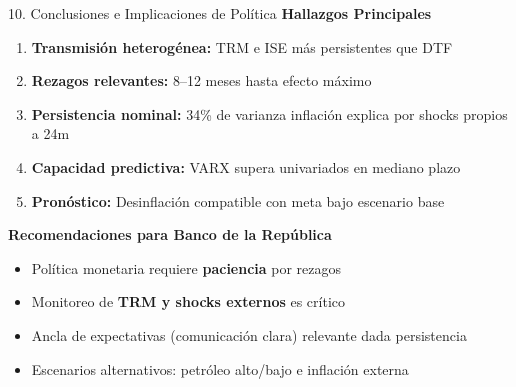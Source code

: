 \documentclass[spanish, 11pt]{beamer}
\begin{document}
\begin{frame}{10. Conclusiones e Implicaciones de Política}
\textbf{Hallazgos Principales}
\begin{enumerate}
  \item \textbf{Transmisión heterogénea:} TRM e ISE más persistentes que DTF
  \item \textbf{Rezagos relevantes:} 8--12 meses hasta efecto máximo
  \item \textbf{Persistencia nominal:} 34\% de varianza inflación explica por shocks propios a 24m
  \item \textbf{Capacidad predictiva:} VARX supera univariados en mediano plazo
  \item \textbf{Pronóstico:} Desinflación compatible con meta bajo escenario base
\end{enumerate}

\vspace{0.3cm}
\textbf{Recomendaciones para Banco de la República}
\begin{itemize}
  \item Política monetaria requiere \textbf{paciencia} por rezagos
  \item Monitoreo de \textbf{TRM y shocks externos} es crítico
  \item Ancla de expectativas (comunicación clara) relevante dada persistencia
  \item Escenarios alternativos: petróleo alto/bajo e inflación externa
\end{itemize}
\end{frame}
\end{document}
